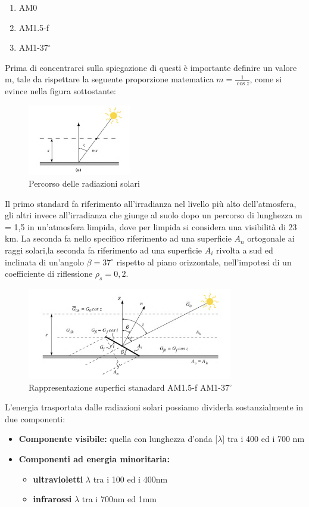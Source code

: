 \begin{enumerate}
    \item AM0
    \item AM1.5-f
    \item AM1-37$^\circ$
\end{enumerate}
Prima di concentrarci sulla spiegazione di questi è importante definire un valore m, tale da rispettare la seguente proporzione matematica $m=\frac{1}{\cos z}$, come si evince nella figura sottostante:
\begin{figure}[H]
    \centering
    \includegraphics[width=0.4\textwidth]{res/cap 2/rappresentazione m.png}
    \caption{Percorso delle radiazioni solari}
\end{figure}
Il primo standard fa riferimento all'irradianza nel livello più alto dell'atmosfera,
gli altri invece all'irradianza che giunge al suolo dopo un percorso di lunghezza m = 1,5 in un'atmosfera limpida, dove per limpida si considera una visibilità di 23 km.
La seconda fa nello specifico riferimento ad una superficie $A_n$ ortogonale ai raggi solari,la seconda fa riferimento ad una superficie $A_i$ rivolta a sud ed inclinata di un'angolo $\beta = 37^\circ$ rispetto al piano orizzontale, nell'impotesi di un coefficiente di riflessione $\rho_s = 0,2$.
\begin{figure}[H]
    \centering
    \includegraphics[width=0.8\textwidth]{res/cap 2/standard.png}
    \caption{Rappresentazione superfici stanadard AM1.5-f AM1-37$^\circ$}
\end{figure}
L'energia trasportata dalle radiazioni solari possiamo dividerla sostanzialmente in due componenti:
\begin{itemize}
    \item \textbf{Componente visibile:} quella con lunghezza d'onda [\textbf{$\lambda$}] tra i 400 ed i 700 nm
    \item \textbf{Componenti ad energia minoritaria:} 
        \begin{itemize}
            \item \textbf{ultravioletti} \textbf{$\lambda$} tra i 100 ed i 400nm
            \item \textbf{infrarossi} \textbf{$\lambda$} tra i 700nm ed 1mm
        \end{itemize}
\end{itemize}
